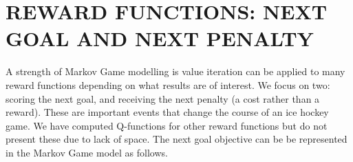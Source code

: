 \documentclass[]{article}
\begin{document}






\section{REWARD FUNCTIONS: NEXT GOAL AND NEXT PENALTY}
A strength of Markov Game modelling is value iteration can be applied to many reward functions depending on what results are of interest. We focus on two: scoring the next goal, and receiving the next penalty (a cost rather than a reward). These are important events that change the course of an ice hockey game.
We have computed Q-functions for other reward functions but do not present these due to lack of space.
The next goal objective can be be represented in the Markov Game model as follows.




\end{document}

